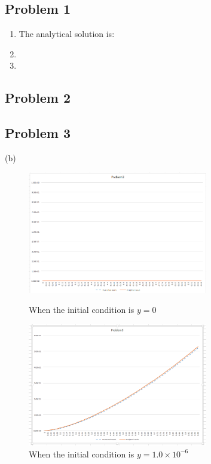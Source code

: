 \documentclass{article}
\begin{document}
 



\hypertarget{}{}
\subsection*{{Problem 1}}
\label{}

\begin{enumerate}


\item 
The analytical solution is:  \\


\item 


\item 

\end{enumerate}


\hypertarget{}{}
\subsection*{{Problem 2}}
\label{}




\hypertarget{}{}
\subsection*{{Problem 3}}

(b) \\ 
\begin{figure} 
\includegraphics[width=0.7\textwidth]{problem3_1} 
\centering
\caption{When the initial condition is $y=0$}
\includegraphics[width=0.7\textwidth]{problem3_2} 
\centering
\caption{When the initial condition is $y=1.0\times10^{-6}$}

\end{figure} 

\label{}
\end{document}
